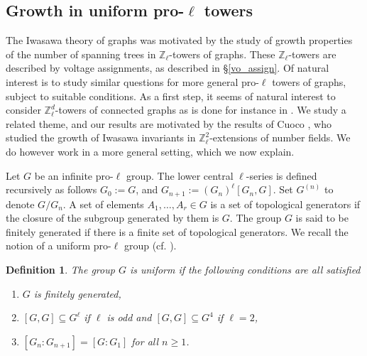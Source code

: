 \documentclass[11pt]{amsart}
\newtheorem{definition}[theorem]{Definition}
\numberwithin{equation}{section}
\theoremstyle{remark}
\newcommand{\Z}{\mathbb{Z}}
\newcommand{\DV}[1]{\textcolor{blue}{#1}}
\begin{document}
\subsection{Growth in uniform pro-$\ell$ towers} 
\par The Iwasawa theory of graphs was motivated by the study of growth properties of the number of spanning trees in $\Z_\ell$-towers of graphs. These $\Z_\ell$-towers are described by voltage assignments, as described in \S \ref{vo_assign}. Of natural interest is to study similar questions for more general pro-$\ell$ towers of graphs, subject to suitable conditions. As a first step, it seems of natural interest to consider $\Z_\ell^d$-towers of connected graphs as is done for instance in \cite{Sage/Vallieres:2022}. We study a related theme, and our results are motivated by the results of Cuoco \cite{cuoco1980growth}, who studied the growth of Iwasawa invariants in $\Z_\ell^2$-extensions of number fields. We do however work in a more general setting, which we now explain.  

\par Let $G$ be an infinite pro-$\ell$ group. The lower central $\ell$-series is defined recursively as follows $G_0:=G$, and $G_{n+1}:=\left(G_{n}\right)^\ell[G_{n}, G]$. Set $G^{(n)}$ to denote $G/G_n$. A set of elements $A_1, \dots, A_r\in G$ is a set of topological generators if the closure of the subgroup generated by them is $G$. The group $G$ is said to be finitely generated if there is a finite set of topological generators. We recall the notion of a uniform pro-$\ell$ group (cf. \cite[Definition 4.1]{dixon2003analytic}). %
\begin{definition}\label{uniform def}
The group $G$ is \emph{uniform} if the following conditions are all satisfied 
\begin{enumerate}
\item\label{uniform def 1} $G$ is finitely generated,
\item\label{uniform def 2} $[G,G]\subseteq G^\ell$ if $\ell$ is odd and $[G,G]\subseteq G^4$ if $\ell=2$, 
\item\label{uniform def 3} $[G_n:G_{n+1}]=[G:G_1]$ for all $n\geq 1$. 
\end{enumerate} 
\end{definition}
\end{document}
